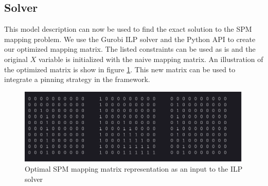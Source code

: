 \subsection{Solver}
This model description can now be used to find the exact solution to the SPM
mapping problem. We use the Gurobi ILP solver and the Python API to create our
optimized mapping matrix. The listed constraints can be used as is and the
original $X$ variable is initialized with the naive mapping matrix.  An
illustration of the optimized matrix is show in figure \ref{fig:optimalSPM2D}.
This new matrix can be used to integrate a pinning strategy in the framework.

\begin{figure}[thb!]
\centering
\includegraphics[scale=0.55]{Figures/optimal_matrix_mapping.png}
\decoRule
\caption[Optimal Mapping 2D Matrix]{Optimal SPM mapping matrix representation as an input to the ILP solver}
\label{fig:optimalSPM2D}
\end{figure}

